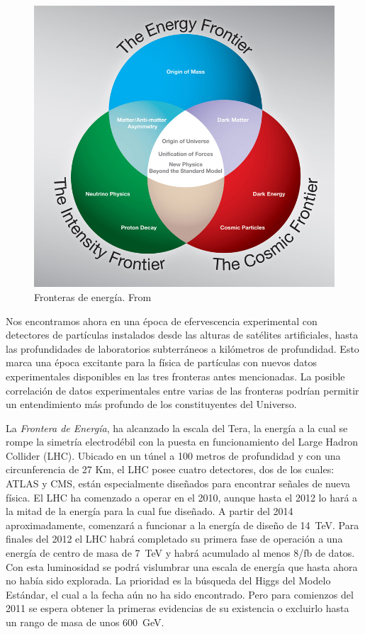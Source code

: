 \begin{figure}
  \centering
\includegraphics[scale=0.3]{three-frontiers-large}
  \caption{Fronteras de energía. From \cite{fermilab}}
  \label{fig:1}
\end{figure}

Nos encontramos ahora en una época de efervescencia experimental con
detectores de partículas instalados desde las alturas de satélites
artificiales, hasta las profundidades de laboratorios subterráneos a
kilómetros de profundidad. Esto marca una época excitante para la
física de partículas con nuevos datos experimentales disponibles en
las tres fronteras antes mencionadas. La posible correlación de datos
experimentales entre varias de las fronteras podrían permitir un
entendimiento más profundo de los constituyentes del Universo.

La \emph{Frontera de Energía}, ha alcanzado la escala del Tera, la
energía a la cual se rompe la simetría electrodébil con la puesta en
funcionamiento del Large Hadron Collider (LHC). Ubicado en un túnel a
100 metros de profundidad y con una circunferencia de 27 Km, el LHC
posee cuatro detectores, dos de los cuales: ATLAS y CMS, están
especialmente diseñados para encontrar señales de nueva física. El LHC
ha comenzado a operar en el 2010, aunque hasta el 2012 lo hará a la
mitad de la energía para la cual fue diseñado. A partir del 2014
aproximadamente, comenzará a funcionar a la energía de diseño de
14~TeV. Para finales del 2012 el LHC habrá completado su primera fase
de operación a una energía de centro de masa de 7~TeV y habrá
acumulado al menos 8/fb de datos. Con esta luminosidad se podrá
vislumbrar una escala de energía que hasta ahora no había sido
explorada. La prioridad es la búsqueda del Higgs del Modelo Estándar,
el cual a la fecha aún no ha sido encontrado. Pero para comienzos del
2011 se espera obtener la primeras evidencias de su existencia o
excluirlo hasta un rango de masa de unos 600~GeV.

